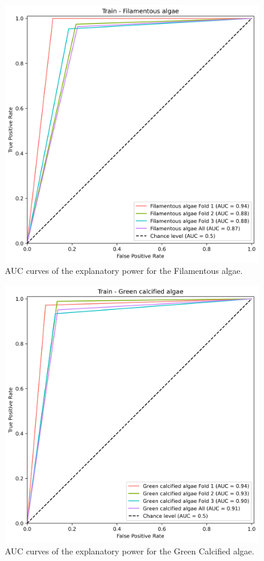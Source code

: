 \begin{figure}
\hypertarget{fig:chap3figS13}{%
\centering
\includegraphics{03-Chapitre3/figures/supplementary/03-receiver_operator_curve_train_rf_Filamentous algae.png}
\caption{AUC curves of the explanatory power for the Filamentous
algae.}\label{fig:chap3figS13}
}
\end{figure}

\begin{figure}
\hypertarget{fig:chap3figS14}{%
\centering
\includegraphics{03-Chapitre3/figures/supplementary/03-receiver_operator_curve_train_rf_Green calcified algae.png}
\caption{AUC curves of the explanatory power for the Green Calcified
algae.}\label{fig:chap3figS14}
}
\end{figure}

